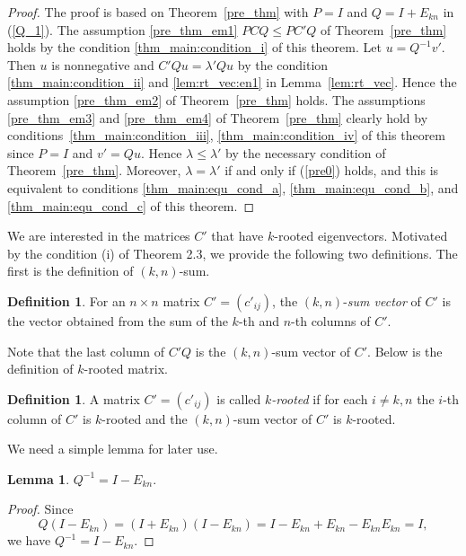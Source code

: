 \documentclass[12pt, a4paper]{article}
\theoremstyle{plain}
\newtheorem{lem}[thm]{Lemma}
\theoremstyle{definition}
\newtheorem{defn}[thm]{Definition}
\begin{document}
\begin{proof}
    The proof is based on Theorem~\ref{pre_thm} with $P = I$ and $Q = I + E_{kn}$ in (\ref{Q_1}).
    The assumption \ref{pre_thm_em1} $PCQ\leq PC'Q$ of Theorem~\ref{pre_thm} holds by the condition \ref{thm_main:condition_i} of this theorem.
    Let $u = Q^{-1}v'$. Then $u$ is nonnegative and $C'Qu = \lambda' Qu$ by the condition \ref{thm_main:condition_ii} and \ref{lem:rt_vec:en1} in
     Lemma~\ref{lem:rt_vec}. Hence the assumption \ref{pre_thm_em2} of Theorem~\ref{pre_thm} holds. The assumptions \ref{pre_thm_em3} and \ref{pre_thm_em4}
      of Theorem~\ref{pre_thm} clearly hold by conditions~\ref{thm_main:condition_iii}, \ref{thm_main:condition_iv} of this theorem since $P = I$ and
       $v'= Qu$. Hence $\lambda \leq \lambda' $ by the necessary condition of Theorem~\ref{pre_thm}. Moreover,
        $\lambda = \lambda'$ if and only if (\ref{pre0}) holds, and this is equivalent to
         conditions \ref{thm_main:equ_cond_a}, \ref{thm_main:equ_cond_b}, and \ref{thm_main:equ_cond_c} of this theorem.
\end{proof}

We are interested in the matrices $C'$ that have $k$-rooted eigenvectors.
Motivated by the condition (i) of Theorem 2.3, we provide the following two definitions.
The first is the definition of $(k,n)$-sum.
\begin{defn}
    For an $n \times n$ matrix $C'=(c'_{ij})$, the $(k, n)$-{\it sum vector} of $C'$ is the vector
     obtained from the sum of the $k$-th and  $n$-th columns of $C'$.
\end{defn}

Note that the last column of $C'Q$ is the $(k, n)$-sum vector of $C'$.
Below is the definition of $k$-rooted matrix.
\begin{defn}\label{m_rooted}
    A  matrix $C'=(c'_{ij})$ is called {\it $k$-rooted}  if for
     each $i\not=k, n$ the  $i$-th column of $C'$  is $k$-rooted
     and the $(k,n)$-sum vector of $C'$ is $k$-rooted.
\end{defn}


We need a simple lemma for later use.

\begin{lem}
$Q^{-1}=I-E_{kn}.$
\end{lem}

\begin{proof}
Since $$Q(I-E_{kn})=(I+E_{kn})(I-E_{kn})=I-E_{kn}+E_{kn}-E_{kn}E_{kn}=I,$$ we have
$Q^{-1}=I-E_{kn}$.
\end{proof}
\end{document}
